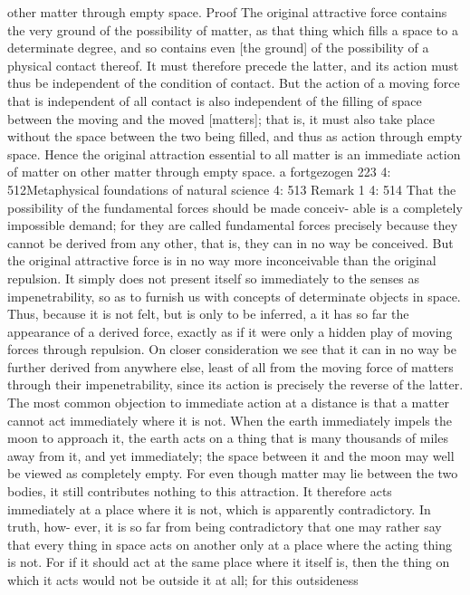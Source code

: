 other matter through empty space.
Proof
The original attractive force contains the very ground of the possibility
of matter, as that thing which ﬁlls a space to a determinate degree, and
so contains even [the ground] of the possibility of a physical contact
thereof. It must therefore precede the latter, and its action must thus
be independent of the condition of contact. But the action of a moving
force that is independent of all contact is also independent of the ﬁlling
of space between the moving and the moved [matters]; that is, it must
also take place without the space between the two being ﬁlled, and thus
as action through empty space. Hence the original attraction essential
to all matter is an immediate action of matter on other matter through
empty space.
a
fortgezogen
223
4: 512Metaphysical foundations of natural science
4: 513 Remark 1
4: 514 That the possibility of the fundamental forces should be made conceiv-
able is a completely impossible demand; for they are called fundamental
forces precisely because they cannot be derived from any other, that is,
they can in no way be conceived. But the original attractive force is in
no way more inconceivable than the original repulsion. It simply does not
present itself so immediately to the senses as impenetrability, so as to
furnish us with concepts of determinate objects in space. Thus, because
it is not felt, but is only to be inferred, a it has so far the appearance of
a derived force, exactly as if it were only a hidden play of moving forces
through repulsion. On closer consideration we see that it can in no way
be further derived from anywhere else, least of all from the moving force
of matters through their impenetrability, since its action is precisely the
reverse of the latter. The most common objection to immediate action
at a distance is that a matter cannot act immediately where it is not. When
the earth immediately impels the moon to approach it, the earth acts on a
thing that is many thousands of miles away from it, and yet immediately;
the space between it and the moon may well be viewed as completely
empty. For even though matter may lie between the two bodies, it still
contributes nothing to this attraction. It therefore acts immediately at a
place where it is not, which is apparently contradictory. In truth, how-
ever, it is so far from being contradictory that one may rather say that
every thing in space acts on another only at a place where the acting
thing is not. For if it should act at the same place where it itself is, then
the thing on which it acts would not be outside it at all; for this outsideness
